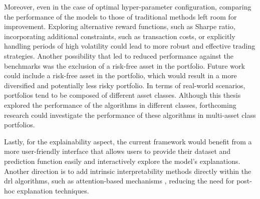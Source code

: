 Moreover, even in the case of optimal hyper-parameter configuration, comparing the performance of the models to those of traditional methods left room for improvement. Exploring alternative reward functions, such as Sharpe ratio, incorporating additional constraints, such as transaction costs, or explicitly handling periods of high volatility could lead to more robust and effective trading strategies. Another possibility that led to reduced performance against the benchmarks was the exclusion of a risk-free asset in the portfolio. Future work could include a risk-free asset in the portfolio, which would result in a more diversified and potentially less risky portfolio. In terms of real-world scenarios, portfolios tend to be composed of different asset classes. Although this thesis explored the performance of the algorithms in different classes, forthcoming research could investigate the performance of these algorithms in multi-asset class portfolios.

Lastly, for the explainability aspect, the current framework would benefit from a more user-friendly interface that allows users to provide their dataset and prediction function easily and interactively explore the model's explanations. Another direction is to add intrinsic interpretability methods directly within the \acrshort{drl} algorithms, such as attention-based mechanisms \cite{Cortes2024}, reducing the need for post-hoc explanation techniques.